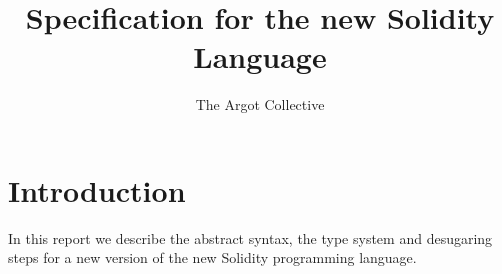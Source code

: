 \documentclass[a4paper, 11pt]{article}
\title{Specification for the new Solidity Language}
\author{The Argot Collective}
\theoremstyle{definition}
\begin{document}
\maketitle

\lstset{
  language=solidity,
  basicstyle=\ttfamily\small,
  keywordstyle=\bfseries,
}



\newcommand{\word}{\ensuremath{\mathtt{word}}}
\newcommand{\unit}{\ensuremath{\mathtt{unit}}}
\newcommand{\bool}{\ensuremath{\mathtt{bool}}}
\newcommand{\typing}[1]{\ensuremath{\overset{\text{\tiny{#1}}}{\vdash}}}
\newcommand{\cc}{\ensuremath{\overset{\text{cc}}}{\leadsto}}
\newcommand{\inst}{\ensuremath{\sqsubseteq}}
\newcommand{\invoke}{\ensuremath{\mathtt{Invokable.invoke}}}
\newcommand{\invokable}{\ensuremath{\mathtt{Invokable}}}
\newcommand{\dom}[1]{\ensuremath{\mathtt{dom}(#1)}}
\newcommand{\id}{\ensuremath{\mathtt{id}}}
\newcommand{\ftv}{\ensuremath{\mathtt{ftv}}}
\newcommand{\fpv}{\ensuremath{\mathtt{fpv}}} 
\newcommand{\closuretype}{\ensuremath{\overset{\tiny{ctype}}{\leadsto}}}
\newcommand{\sig}{\ensuremath{\overset{\tiny{sig}}{\leadsto}}}
\newcommand{\unique}{\ensuremath{\overset{\tiny{unique}}{\leadsto}}}
\newcommand{\geninvoke}{\ensuremath{\overset{\tiny{gen}}{\leadsto}}}
\newcommand{\sats}[3]{\Theta ; #3 \vdash^{\mathtt{sats}} #1 \leadsto #2}
\newcommand{\mgu}{\ensuremath{\mathtt{mgu}}}
\newcommand{\reduce}{\vdash^{\mathtt{red}}}
\newcommand{\simp}{\vdash^{\mathtt{simp}}}
\newcommand{\impr}{\vdash^{\mathtt{impr}}}
\newcommand{\solidity}{new Solidity } 



\section{Introduction}\label{sec:introduction}

In this report we describe the abstract syntax, 
the type system and desugaring steps for a new 
version of the \solidity programming language.
\end{document}
